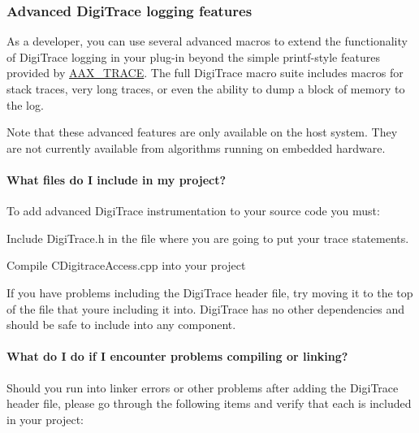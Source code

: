 \hypertarget{a00364_digitrace__tracingfromplugins__advancedlogging}{}\subsubsection{Advanced Digi\+Trace logging features}\label{a00364_digitrace__tracingfromplugins__advancedlogging}
 As a developer, you can use several advanced macros to extend the functionality of Digi\+Trace logging in your plug-\/in beyond the simple {\ttfamily printf}-\/style features provided by \hyperlink{a00158_ab53f1d6a94f8b6ebb3a101f71bfe4e82}{A\+A\+X\+\_\+\+T\+R\+A\+C\+E}. The full Digi\+Trace macro suite includes macros for stack traces, very long traces, or even the ability to dump a block of memory to the log.

 Note that these advanced features are only available on the host system. They are not currently available from algorithms running on embedded hardware.

\hypertarget{a00364_digitrace__advancedlogging__filestoinclude}{}\paragraph{What files do I include in my project?}\label{a00364_digitrace__advancedlogging__filestoinclude}
 To add advanced Digi\+Trace instrumentation to your source code you must\+:


\begin{DoxyEnumerate}
\item Include Digi\+Trace.\+h in the file where you are going to put your trace statements.
\item Compile C\+Digitrace\+Access.\+cpp into your project
\end{DoxyEnumerate}

 If you have problems including the Digi\+Trace header file, try moving it to the top of the file that you\textquotesingle{}re including it into. Digi\+Trace has no other dependencies and should be safe to include into any component.

\hypertarget{a00364_digitrace__advancedlogging__filestoinclude__troubleshooting}{}\paragraph{What do I do if I encounter problems compiling or linking?}\label{a00364_digitrace__advancedlogging__filestoinclude__troubleshooting}
 Should you run into linker errors or other problems after adding the Digi\+Trace header file, please go through the following items and verify that each is included in your project\+:


